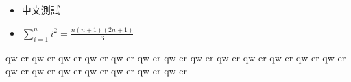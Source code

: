 \begin{itemize}
\item 中文測試 
\item $\sum \limits_{i=1}^n i^2 = \frac{n(n+1)(2n+1)}{6}$
\end{itemize}
qw
er
qw
er
qw
er
qw
er
qw
er
qw
er
qw
er
qw
er
qw
er
qw
er
qw
er
qw
er
qw
er
qw
er
qw
er
qw
er
qw
er
qw
er
qw
er
qw
er

